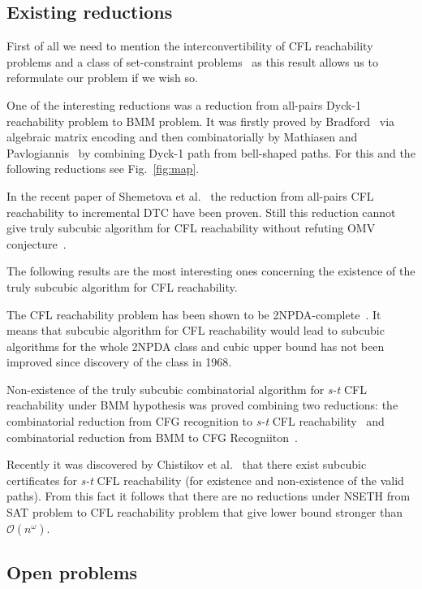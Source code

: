 \documentclass[acmsmall,review,nonacm]{acmart}\settopmatter{printfolios=true,printccs=false,printacmref=false}
\begin{document}
	\subsection{Existing reductions}
	
	First of all we need to mention the interconvertibility of CFL reachability problems and a class of set-constraint problems~\cite{10.1145/258994.259006} as this result allows us to reformulate our problem if we wish so.
	
	One of the interesting reductions was a reduction from  all-pairs Dyck-1 reachability problem to BMM problem. It was firstly proved by Bradford~\cite{bradford2017efficient} via algebraic matrix encoding and then combinatorially by Mathiasen and Pavlogiannis~\cite{10.1145/3434315} by combining Dyck-1 path from bell-shaped paths. For this and the following reductions see Fig.~\ref{fig:map}.
	
	In the recent paper of Shemetova et al.~\cite{shemetova2021algorithm} the reduction from all-pairs CFL reachability to incremental DTC have been proven. Still this reduction cannot give truly subcubic algorithm for CFL reachability without refuting OMV conjecture~\cite{8948597, 10.1145/2746539.2746609}.
	
	The following results are the most interesting ones concerning the existence of  the truly subcubic algorithm for CFL reachability.
	
	The CFL reachability problem has been shown to be 2NPDA-complete~\cite{10.5555/788019.788876}. It means that subcubic algorithm for CFL reachability would lead to subcubic algorithms for the whole 2NPDA class and cubic upper bound has not been improved since discovery of the class in 1968.
	
	Non-existence of the truly subcubic combinatorial algorithm for \emph{s-t} CFL reachability under BMM hypothesis was proved combining two reductions: the combinatorial reduction from CFG recognition to \emph{s-t} CFL reachability~\cite{10.1145/3158118} and combinatorial reduction from BMM to CFG Recogniiton~\cite{10.1145/505241.505242}.
	
	Recently it was discovered by Chistikov et al.~\cite{chistikov2021subcubic} that there exist subcubic certificates for \emph{s-t} CFL reachability (for existence and non-existence of the valid paths). From this fact it follows that there are no reductions under NSETH from SAT problem to CFL reachability problem that give lower bound stronger than $\mathcal{O}(n^{\omega})$.
	
	\subsection{Open problems}
	
\end{document}
